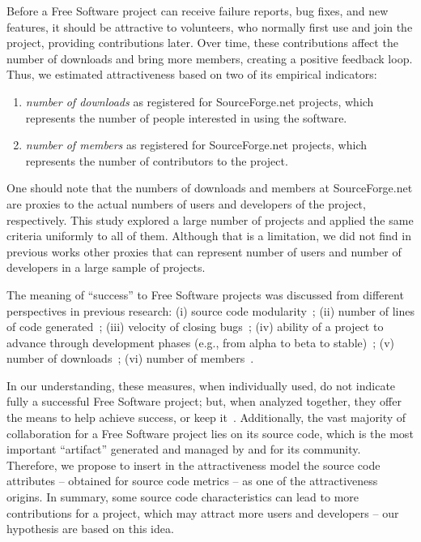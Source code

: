 \documentclass[conference]{IEEEtran}
\begin{document}
%
Before a Free Software project can receive failure reports, bug fixes, 
and new features, it should be attractive to volunteers, who normally first
use and join the project, providing contributions later.
%
Over time, these contributions affect the number of downloads and bring more 
members, creating a positive feedback loop.
%
Thus, we estimated attractiveness based on two of its empirical indicators:
\begin{enumerate}
\item \emph{number of downloads} as registered for SourceForge.net projects, which
represents the number of people interested in using the software.
\item \emph{number of members} as registered for SourceForge.net projects, which
represents the number of contributors to the project.
\end{enumerate}


One should note that the numbers of downloads and members at SourceForge.net
are proxies to the actual numbers of users and developers of the project, respectively.
%
This study explored a large number of projects and applied the same criteria
uniformly to all of them. 
%
Although that is a limitation, we did not find in previous works other proxies
that can represent number of users and number of developers in a large sample of projects.

The meaning of ``success'' to Free Software projects was discussed from
different perspectives in previous research:
%
(i) source code modularity~\cite{shaikh2003};
(ii) number of lines of code generated~\cite{mockus2000};
(iii) velocity of closing bugs~\cite{Stewart2006};
(iv) ability of a project to advance through development phases
(e.g., from alpha to beta to stable)~\cite{raja2006,Crowston2002};
(v) number of downloads~\cite{balijepally2009};
(vi) number of members~\cite{crowston2006}.

In our understanding, these measures, when individually used, do not indicate
fully a successful Free Software project; but, when analyzed together, they
offer the means to help achieve success, or keep it~\cite{Santos2010}.
%
Additionally, the vast majority of collaboration for a Free Software project
lies on its source code, which is the most important ``artifact'' generated and
managed by and for its community.
%
Therefore, we propose to insert in the attractiveness model the source code
attributes -- obtained for source code metrics -- as one of the attractiveness origins.
%
In summary, some source code characteristics can lead to more contributions for
a project, which may attract more users and developers -- our hypothesis are based
on this idea.
\end{document}

